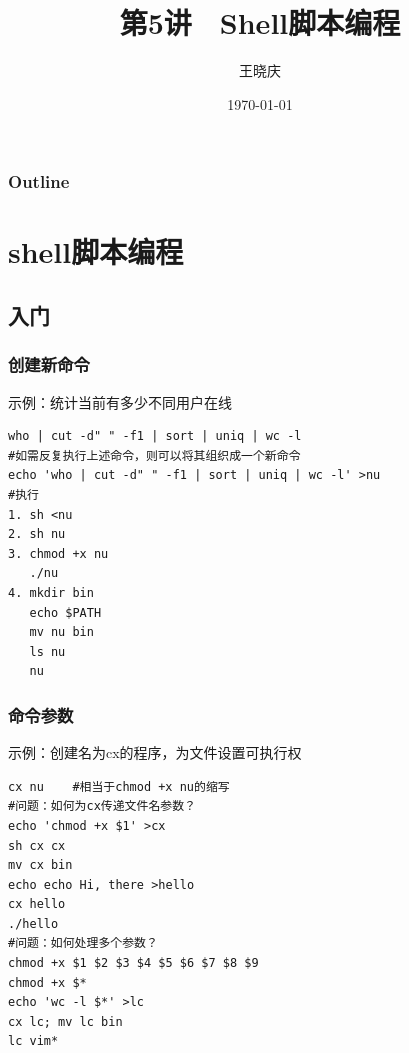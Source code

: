 \documentclass[xcolor=svgnames,presentation]{beamer}
\title{第5讲　Shell脚本编程}
\author{王晓庆}
\date{\today}
\institute{wangxiaoqing@outlook.com}
\begin{document}
\maketitle

\begin{frame}
\frametitle{Outline}
\setcounter{tocdepth}{1}
\tableofcontents
\end{frame}

\section{shell脚本编程}
\label{sec-1}
\subsection{入门}
\label{sec-1-1}
\begin{frame}[fragile]
\frametitle{创建新命令}
\label{sec-1-1-1}
\begin{exampleblock}{示例：统计当前有多少不同用户在线}
\label{sec-1-1-1-1}


\begin{verbatim}
who | cut -d" " -f1 | sort | uniq | wc -l
#如需反复执行上述命令，则可以将其组织成一个新命令
echo 'who | cut -d" " -f1 | sort | uniq | wc -l' >nu
#执行
1. sh <nu
2. sh nu
3. chmod +x nu
   ./nu
4. mkdir bin
   echo $PATH
   mv nu bin
   ls nu
   nu
\end{verbatim}
\end{exampleblock}
\end{frame}
\begin{frame}[fragile]
\frametitle{命令参数}
\label{sec-1-1-2}
\begin{exampleblock}{示例：创建名为cx的程序，为文件设置可执行权}
\label{sec-1-1-2-1}


\begin{verbatim}
cx nu    #相当于chmod +x nu的缩写
#问题：如何为cx传递文件名参数？
echo 'chmod +x $1' >cx
sh cx cx
mv cx bin
echo echo Hi, there >hello
cx hello
./hello
#问题：如何处理多个参数？
chmod +x $1 $2 $3 $4 $5 $6 $7 $8 $9
chmod +x $*
echo 'wc -l $*' >lc
cx lc; mv lc bin
lc vim*
\end{verbatim}
\end{exampleblock}
\end{frame}
\end{document}
